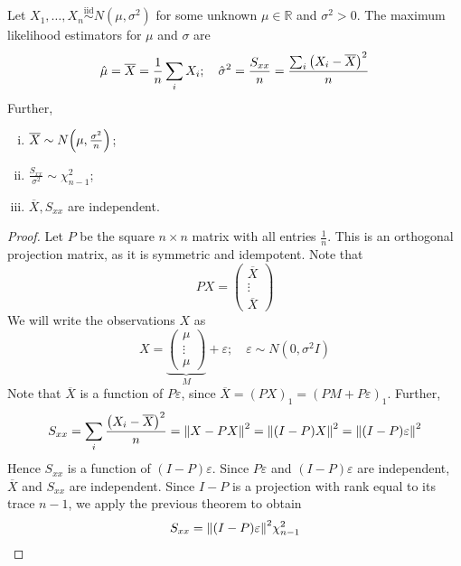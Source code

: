 \begin{theorem}
	Let \( X_1, \dots, X_n \overset{\text{iid}}{\sim} N(\mu,\sigma^2) \) for some unknown \( \mu \in \mathbb R \) and \( \sigma^2 > 0 \).
	The maximum likelihood estimators for \( \mu \) and \( \sigma \) are
	\[ \hat \mu = \overline X = \frac{1}{n} \sum_i X_i;\quad \hat \sigma^2 = \frac{S_{xx}}{n} = \frac{\sum_i \qty(X_i - \overline X)^2}{n} \]
	Further,
	\begin{enumerate}[(i)]
		\item \( \overline X \sim N\qty(\mu, \frac{\sigma^2}{n}) \);
		\item \( \frac{S_{xx}}{\sigma^2} \sim \chi^2_{n-1} \);
		\item \( \overline X, S_{xx} \) are independent.
	\end{enumerate}
\end{theorem}
\begin{proof}
	Let \( P \) be the square \( n \times n \) matrix with all entries \( \frac{1}{n} \).
	This is an orthogonal projection matrix, as it is symmetric and idempotent.
	Note that
	\[ PX = \begin{pmatrix}
		\overline X \\
		\vdots \\
		\overline X
	\end{pmatrix} \]
	We will write the observations \( X \) as
	\[ X = \underbrace{\begin{pmatrix}
		\mu \\
		\vdots \\
		\mu
	\end{pmatrix}}_{M} + \varepsilon;\quad \varepsilon \sim N(0,\sigma^2 I) \]
	Note that \( \overline X \) is a function of \( P \varepsilon \), since \( \overline X = (PX)_1 = (PM + P\varepsilon)_1 \).
	Further,
	\[ S_{xx} = \sum_i \frac{\qty(X_i - \overline X)^2}{n} = \norm{X - PX}^2 = \norm{(I-P)X}^2 = \norm{(I-P)\varepsilon}^2 \]
	Hence \( S_{xx} \) is a function of \( (I-P)\varepsilon \).
	Since \( P\varepsilon \) and \( (I-P)\varepsilon \) are independent, \( \overline X \) and \( S_{xx} \) are independent.
	Since \( I-P \) is a projection with rank equal to its trace \( n-1 \), we apply the previous theorem to obtain
	\[ S_{xx} = \norm{(I-P)\varepsilon}^2 \chi^2_{n-1} \]
\end{proof}

